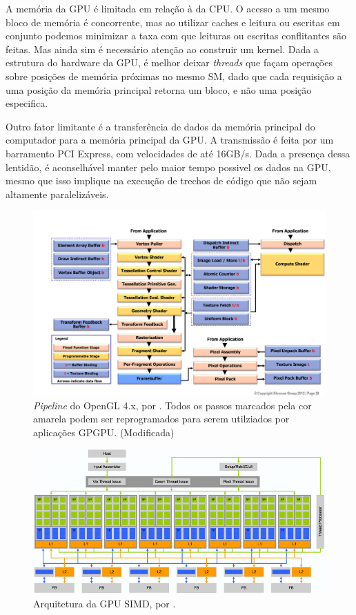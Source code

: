     A memória da GPU é limitada em relação à da CPU. O acesso a um mesmo bloco de memória é concorrente, mas ao utilizar caches e leitura
ou escritas em conjunto podemos minimizar a taxa com que leituras ou escritas conflitantes são feitas. Mas ainda sim é
necessário atenção ao construir um kernel. Dada a estrutura do hardware da GPU, é melhor deixar \textit{threads} que façam
operações sobre posições de memória próximas no mesmo SM, dado que cada requisição
a uma posição da memória principal retorna um bloco, e não uma posição especifica.

    Outro fator limitante é a transferência de dados da memória principal do computador para a memória
principal da GPU. A transmissão é feita por um barramento PCI Express, com velocidades de até 16GB/s.
Dada a presença dessa lentidão, é aconselhável manter pelo maior tempo possivel
os dados na GPU, mesmo que isso implique na execução de trechos de código que não
sejam altamente paralelizáveis.

\begin{figure}[H]
    \centering
    \includegraphics[width=1\textwidth]{figuras/pipeline.jpg}
    \caption{\textit{Pipeline} do OpenGL 4.x, por \citep{pipeline}. Todos os passos marcados pela cor amarela podem
    ser reprogramados para serem utilziados por aplicações GPGPU. (Modificada)}
    \label{fig:pipeline}
\end{figure}

\begin{figure}[H]
    \centering
    \includegraphics[width=1\textwidth]{figuras/simd.jpg}
    \caption{Arquitetura da GPU SIMD, por \citep{blythe2008rise}.}
    \label{fig:simd}
\end{figure}

